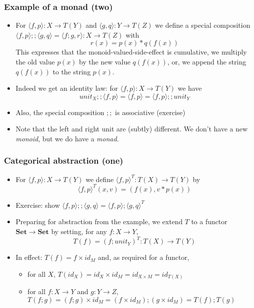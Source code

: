 \documentclass[handout]{beamer}
\newcommand{\bfsf}[1]{{\boldsymbol{#1}}}
\newcommand{\Set}{\bfsf{Set}}
\newcommand{\Kp}[1]{{\langle #1 \rangle}}
\newcommand{\Kc}{;\!;}
\begin{document}
\frame
  {   
    \frametitle{Example of a monad (two)}\label{Mon5:ExaSetMtwo}

 \begin{itemize}[<+->]
\item For $\Kp{f,p}: X\to T(Y)$ and $\Kp{g,q}: Y\to T(Z)$ we define a special
composition $\Kp{f,p}\Kc \Kp{g,q} = \Kp{f;g,r} : X\to T(Z)$ with $$r(x)=p(x)*q(f(x))$$
This expresses that the monoid-valued-side-effect is cumulative,
we multiply the old value $p(x)$ by the new value $q(f(x))$,
or, we append the string $q(f(x))$ to the string $p(x)$.
\item Indeed we get an identity law: for $\Kp{f,p}: X\to T(Y)$ we have
$$unit_X\Kc \Kp{f,p}  = \Kp{f,p} = \Kp{f,p}\Kc unit_Y$$
\item Also, the special composition $\Kc$ is associative  (exercise)
\item Note that the left and right unit are (subtly) different.
We don't have a new \emph{monoid}, but we do have a \emph{monad}.
 \end{itemize}

 }

\frame
  {   
    \frametitle{Categorical abstraction (one)}\label{Mon5:CatAbstrOne}

 \begin{itemize}[<+->]
\item For $\Kp{f,p} : X\to T(Y)$ we define $\Kp{f,p}^T : T(X)\to T(Y)$ by
$$\Kp{f,p}^T(x,v) = (f(x),v*p(x))$$
\item Exercise: show $\Kp{f,p}\Kc\Kp{g,q} = \Kp{f,p};\Kp{g,q}^T$
\item Preparing for abstraction from the example,
we extend $T$ to a functor $\Set\to\Set$ 
by setting, for any $f:X\to Y$,  $$T(f) = (f; unit_Y)^T : T(X)\to T(Y)$$
\item In effect: $T(f) = f\times id_M$ and, as required for a functor,
\begin{itemize}
\item for all $X$,
$T(id_X) = id_X \times id_M = id_{X\times M} = id_{T(X)}$
\item for all $f:X\to Y$ and $g:Y\to Z$, $T(f;g) = (f;g)\times id_M =
(f\times id_M);(g\times id_M) = T(f); T(g)$
\end{itemize}
 \end{itemize}

 }
\end{document}
